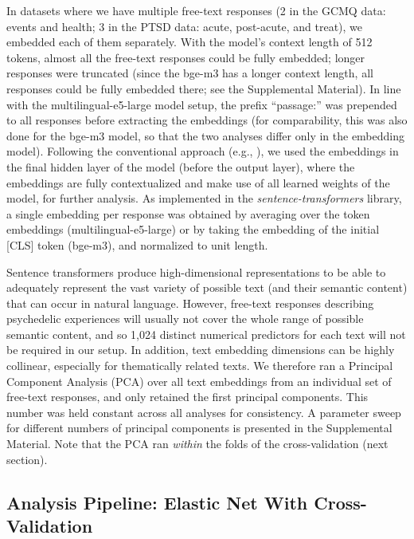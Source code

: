 \documentclass[man,floatsintext]{apa7}
\newcommand{\change}[1]{#1}
\begin{document}
In datasets where we have multiple free-text responses (2 in the GCMQ data: events and health; 3 in the PTSD data: acute, post-acute, and treat), we embedded each of them separately.  With the model's context length of 512 tokens, almost all the free-text responses could be fully embedded; longer responses were truncated (since the bge-m3 has a longer context length, all responses could be fully embedded there; see the Supplemental Material). In line with the  multilingual-e5-large model setup, the prefix ``passage:'' was \change{prepended} to all responses before extracting the embeddings\change{ (for comparability, this was also done for the bge-m3 model, so that the two analyses differ only in the embedding model)}. Following the conventional approach (e.g., \cite{kjell2023text}), we used the embeddings in the final hidden layer of the model (before the output layer), where the embeddings are fully contextualized and make use of all learned weights of the model, for further analysis\change{. As implemented in the \emph{sentence-transformers} library, a single embedding per response was obtained by averaging over the token embeddings (multilingual-e5-large) or by taking the embedding of the initial [CLS] token (bge-m3), and normalized to unit length}.

Sentence transformers produce high-dimensional representations to be able to adequately represent the vast variety of possible text (and their semantic content) that can occur in natural language. However, free-text responses describing psychedelic experiences will usually not cover the whole range of possible semantic content, and so 1,024 distinct numerical predictors for each text will not be required in our setup. In addition, text embedding dimensions can be highly collinear, especially for thematically related texts. We therefore ran a Principal Component Analysis (PCA) over all text embeddings from an individual set of free-text responses, and only retained the  first principal components. This number was held constant across all analyses for consistency. A parameter sweep for different numbers of principal components is presented in the Supplemental Material. \change{Note that the PCA ran \emph{within} the folds of the cross-validation (next section).}

\subsection{Analysis Pipeline: Elastic Net With Cross-Validation}
\end{document}
